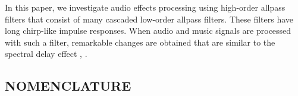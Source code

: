 \documentclass{aes2e}
\begin{document}
In this paper, we investigate audio effects processing using high-order allpass filters that consist of many cascaded low-order allpass filters. These filters have long chirp-like impulse responses. When audio and music signals are processed with such a filter, remarkable changes are obtained that are similar to the spectral delay effect  \cite{DEK3}, \cite{DEK4}.


\begin{nomenclature}[PAMPs]
\subsection*{NOMENCLATURE}



\end{nomenclature}
\end{document}
